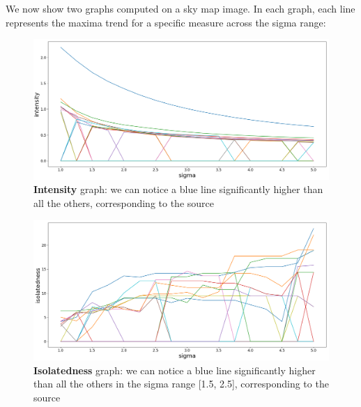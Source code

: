 \documentclass[a4paper,12pt,oneside]{book}
\begin{document}
\begin{onehalfspace}
    We now show two graphs computed on a sky map image. In each graph, each line represents the maxima trend for a specific measure across the sigma range:
	\begin{figure}[h!]
		\centering
		\captionsetup{justification=centering}
		\includegraphics[width=\textwidth]{intensity}
		\caption{\textbf{Intensity} graph: we can notice a blue line significantly higher than all the others, corresponding to the source}
		\label{fig:intensity}
	\end{figure}
	
	\begin{figure}[h!]
		\centering
		\captionsetup{justification=centering}
		\includegraphics[width=\textwidth]{isolatedness}
		\caption{\textbf{Isolatedness} graph: we can notice a blue line significantly higher than all the others in the sigma range [1.5, 2.5], corresponding to the source}
		\label{fig:isolatedness}
	\end{figure}
    

\end{onehalfspace}
\end{document}
